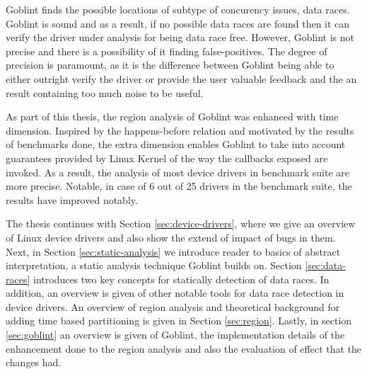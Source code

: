 \documentclass[..thesis.tex]{subfiles}
\begin{document}
Goblint finds the possible locations of subtype of concurency issues, data races. Goblint is sound and as a result, if no possible data races are found then it can verify the driver under analysis for being data race free. However, Goblint is not precise and there is a possibility of it finding false-positives. The degree of precision is paramount, as it is the difference between Goblint being able to either outright verify the driver or provide the user valuable feedback and the an result containing too much noise to be useful.
  

As part of this thesis, the region analysis of Goblint was enhanced with time dimension. Inspired by the happens-before relation and motivated by the results of benchmarks done, the extra dimension enables Goblint to take into account guarantees provided by Linux Kernel of the way the callbacks exposed are invoked. As a result, the analysis of most device drivers in benchmark suite are more precise. Notable, in case of 6 out of 25 drivers in the benchmark suite, the results have improved notably.


The thesis continues with Section \ref{sec:device-drivers}, where we give an overview of Linux device drivers and also show the extend of impact of bugs in them. Next, in Section \ref{sec:static-analysis} we introduce reader to basics of abstract interpretation, a static analysis technique Goblint builds on. Section \ref{sec:data-races} introduces two key concepts for statically detection of data races. In addition, an overview is given of other notable tools for data race detection in device drivers. An overview of region analysis and theoretical background for adding time based partitioning is given in Section \ref{sec:region}. Lastly, in section \ref{sec:goblint} an overview is given of Goblint, the implementation details of the enhancement done to the region analysis and also the evaluation of effect that the changes had.  
\end{document}
